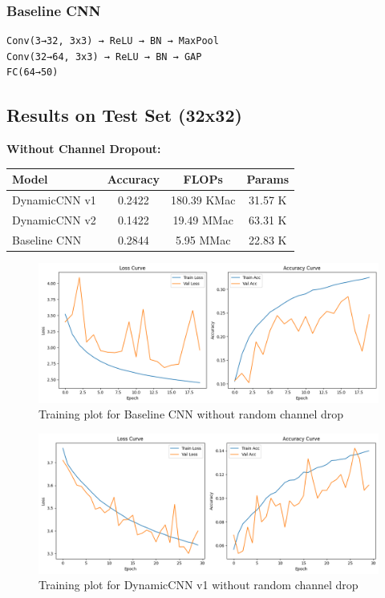 \documentclass[12pt]{article}
\begin{document}
\subsubsection*{Baseline CNN}
\begin{Verbatim}
Conv(3→32, 3x3) → ReLU → BN → MaxPool
Conv(32→64, 3x3) → ReLU → BN → GAP
FC(64→50)
\end{Verbatim}

\subsection*{Results on Test Set (32x32)}

\textbf{Without Channel Dropout:}
\begin{center}
\begin{tabular}{lccc}
\toprule
Model & Accuracy & FLOPs & Params \\
\midrule
DynamicCNN v1 & 0.2422 & 180.39 KMac & 31.57 K \\
DynamicCNN v2 & 0.1422 & 19.49 MMac & 63.31 K \\
Baseline CNN & 0.2844 & 5.95 MMac & 22.83 K \\
\bottomrule
\end{tabular}
\end{center}

\begin{figure}[H]
\centering
\includegraphics[width=0.8\linewidth]{results/Baseline_CNN_no_drop.png}
\caption{Training plot for Baseline CNN  without random channel drop}
\end{figure}

\begin{figure}[H]
\centering
\includegraphics[width=0.8\linewidth]{results/Dynamic1_no_drop.png}
\caption{Training plot for DynamicCNN v1 without random channel drop}
\end{figure}
\end{document}
